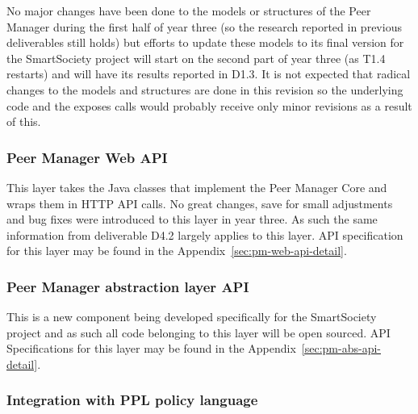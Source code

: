 No major changes have been done to the models or structures of the Peer Manager during the first half of year three (so the research reported in previous deliverables still holds) but efforts to update these models to its final version for the SmartSociety project will start on the second part of year three (as T1.4 restarts) and will have its results reported in D1.3. It is not expected that radical changes to the models and structures are done in this revision so the underlying code and the exposes calls would probably receive only minor revisions as a result of this. 

\subsubsection{Peer Manager Web API} \label{ssec:pm-web-api}
This layer takes the Java classes that implement the Peer Manager Core and wraps them in HTTP API calls. 
No great changes, save for small adjustments and bug fixes were introduced to this layer in year three. As such the same information from deliverable D4.2 largely applies to this layer.
API specification for this layer may be found in the Appendix~\ref{sec:pm-web-api-detail}.


\subsubsection{Peer Manager abstraction layer API} \label{ssec:pm-abs-api}
This is a new component being developed specifically for the SmartSociety project and as such all code belonging to this layer will be open sourced. API Specifications for this layer may be found in the Appendix~\ref{sec:pm-abs-api-detail}.


\subsubsection{Integration with PPL policy language}
